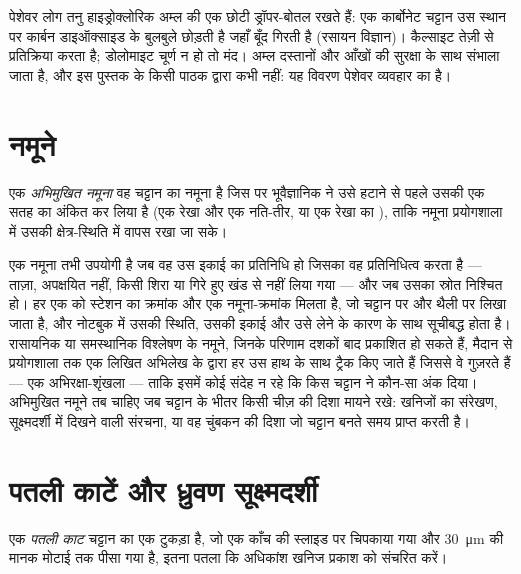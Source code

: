 पेशेवर लोग तनु हाइड्रोक्लोरिक अम्ल की एक छोटी ड्रॉपर-बोतल रखते हैं: एक कार्बोनेट चट्टान उस स्थान पर कार्बन डाइऑक्साइड के बुलबुले
छोड़ती है जहाँ बूँद गिरती है (रसायन विज्ञान)। कैल्साइट तेज़ी से प्रतिक्रिया करता है; डोलोमाइट चूर्ण न हो तो मंद।
अम्ल दस्तानों और आँखों की सुरक्षा के साथ संभाला जाता है, और इस पुस्तक के किसी पाठक द्वारा कभी नहीं: यह विवरण पेशेवर
व्यवहार का है।

\section{नमूने}

\begin{definition}[अभिमुखित नमूना]\label{def:b1:field-lab-methods-1:sample}
एक \emph{अभिमुखित नमूना} वह चट्टान का नमूना है जिस पर भूवैज्ञानिक ने उसे हटाने से पहले उसकी
एक सतह का  अंकित कर लिया है (एक  रेखा और एक नति-तीर, या एक रेखा का ), ताकि नमूना
प्रयोगशाला में उसकी क्षेत्र-स्थिति में वापस रखा जा सके।
\end{definition}

एक नमूना तभी उपयोगी है जब वह उस इकाई का प्रतिनिधि हो जिसका वह प्रतिनिधित्व करता है --- ताज़ा, अपक्षयित नहीं,
किसी शिरा या गिरे हुए खंड से नहीं लिया गया --- और जब उसका स्रोत निश्चित हो। हर एक को स्टेशन का क्रमांक और एक
नमूना-क्रमांक मिलता है, जो चट्टान पर और थैली पर लिखा जाता है, और नोटबुक में उसकी स्थिति, उसकी इकाई और उसे लेने
के कारण के साथ सूचीबद्ध होता है। रासायनिक या समस्थानिक विश्लेषण के नमूने, जिनके परिणाम दशकों बाद प्रकाशित हो सकते
हैं, मैदान से प्रयोगशाला तक एक लिखित अभिलेख के द्वारा हर उस हाथ के साथ ट्रैक किए जाते हैं जिससे वे गुज़रते हैं ---
एक अभिरक्षा-शृंखला --- ताकि इसमें कोई संदेह न रहे कि किस चट्टान ने कौन-सा अंक दिया। अभिमुखित नमूने तब चाहिए
जब चट्टान के भीतर किसी चीज़ की दिशा मायने रखे: खनिजों का संरेखण, सूक्ष्मदर्शी में दिखने वाली संरचना, या वह
चुंबकन की दिशा जो चट्टान बनते समय प्राप्त करती है।

\section{पतली काटें और ध्रुवण सूक्ष्मदर्शी}

\begin{definition}[पतली काट]\label{def:b1:field-lab-methods-1:thin-section}
एक \emph{पतली काट} चट्टान का एक टुकड़ा है, जो एक काँच की स्लाइड पर चिपकाया गया और
\qty{30}{\micro\metre} की मानक मोटाई तक पीसा गया है, इतना पतला कि अधिकांश खनिज प्रकाश को संचरित करें।
\end{definition}

